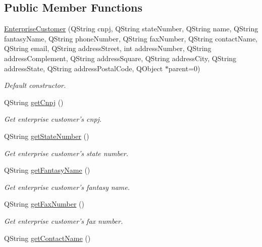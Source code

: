 \subsection*{\-Public \-Member \-Functions}
\begin{DoxyCompactItemize}
\item 
\hyperlink{class_enterprise_customer_a2a8712ad1037b857be1b66b2338511fd}{\-Enterprise\-Customer} (\-Q\-String cnpj, \-Q\-String state\-Number, \-Q\-String name, \-Q\-String fantasy\-Name, \-Q\-String phone\-Number, \-Q\-String fax\-Number, \-Q\-String contact\-Name, \-Q\-String email, \-Q\-String address\-Street, int address\-Number, \-Q\-String address\-Complement, \-Q\-String address\-Square, \-Q\-String address\-City, \-Q\-String address\-State, \-Q\-String address\-Postal\-Code, \-Q\-Object $\ast$parent=0)
\begin{DoxyCompactList}\small\item\em \-Default constructor. \end{DoxyCompactList}\item 
\-Q\-String \hyperlink{class_enterprise_customer_a33751b5bbfd10d1e8476a8ec352a9455}{get\-Cnpj} ()
\begin{DoxyCompactList}\small\item\em \-Get enterprise customer's cnpj. \end{DoxyCompactList}\item 
\-Q\-String \hyperlink{class_enterprise_customer_a5513db274ebf2bc0c2f17b311161534f}{get\-State\-Number} ()
\begin{DoxyCompactList}\small\item\em \-Get enterprise customer's state number. \end{DoxyCompactList}\item 
\-Q\-String \hyperlink{class_enterprise_customer_a98eea6072ec2cba07245c322e30a2190}{get\-Fantasy\-Name} ()
\begin{DoxyCompactList}\small\item\em \-Get enterprise customer's fantasy name. \end{DoxyCompactList}\item 
\-Q\-String \hyperlink{class_enterprise_customer_a24e8d8c1e8c637f167261703141be621}{get\-Fax\-Number} ()
\begin{DoxyCompactList}\small\item\em \-Get enterprise customer's fax number. \end{DoxyCompactList}\item 
\-Q\-String \hyperlink{class_enterprise_customer_af43a97879335afbe22098ce62ddc2ca4}{get\-Contact\-Name} ()

\end{DoxyCompactItemize}

